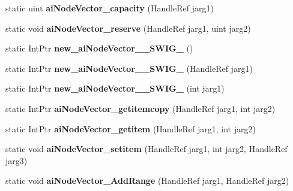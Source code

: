 \begin{DoxyCompactItemize}
\item 
\hypertarget{class_assimp_p_i_n_v_o_k_e_a97a3a3d3aad72b96b598fd50b7a376be}{static uint {\bfseries ai\+Node\+Vector\+\_\+capacity} (Handle\+Ref jarg1)}\label{class_assimp_p_i_n_v_o_k_e_a97a3a3d3aad72b96b598fd50b7a376be}

\item 
\hypertarget{class_assimp_p_i_n_v_o_k_e_afd44c62a430c904b047dfdff0bf4e75c}{static void {\bfseries ai\+Node\+Vector\+\_\+reserve} (Handle\+Ref jarg1, uint jarg2)}\label{class_assimp_p_i_n_v_o_k_e_afd44c62a430c904b047dfdff0bf4e75c}

\item 
\hypertarget{class_assimp_p_i_n_v_o_k_e_a8ef802bbaa2bda6a39f1a766673c5c5e}{static Int\+Ptr {\bfseries new\+\_\+ai\+Node\+Vector\+\_\+\+\_\+\+S\+W\+I\+G\+\_} ()}\label{class_assimp_p_i_n_v_o_k_e_a8ef802bbaa2bda6a39f1a766673c5c5e}

\item 
\hypertarget{class_assimp_p_i_n_v_o_k_e_a12d0d50370572836f72e5e6427dcd753}{static Int\+Ptr {\bfseries new\+\_\+ai\+Node\+Vector\+\_\+\+\_\+\+S\+W\+I\+G\+\_} (Handle\+Ref jarg1)}\label{class_assimp_p_i_n_v_o_k_e_a12d0d50370572836f72e5e6427dcd753}

\item 
\hypertarget{class_assimp_p_i_n_v_o_k_e_a8112a6282d226e2bd074a6f7b172a1a5}{static Int\+Ptr {\bfseries new\+\_\+ai\+Node\+Vector\+\_\+\+\_\+\+S\+W\+I\+G\+\_} (int jarg1)}\label{class_assimp_p_i_n_v_o_k_e_a8112a6282d226e2bd074a6f7b172a1a5}

\item 
\hypertarget{class_assimp_p_i_n_v_o_k_e_a8cd2fed0980089755ba81bba767c5d3f}{static Int\+Ptr {\bfseries ai\+Node\+Vector\+\_\+getitemcopy} (Handle\+Ref jarg1, int jarg2)}\label{class_assimp_p_i_n_v_o_k_e_a8cd2fed0980089755ba81bba767c5d3f}

\item 
\hypertarget{class_assimp_p_i_n_v_o_k_e_a21d07c2cfa9b19c0bcb49d98894e044c}{static Int\+Ptr {\bfseries ai\+Node\+Vector\+\_\+getitem} (Handle\+Ref jarg1, int jarg2)}\label{class_assimp_p_i_n_v_o_k_e_a21d07c2cfa9b19c0bcb49d98894e044c}

\item 
\hypertarget{class_assimp_p_i_n_v_o_k_e_a74901f4ec8386c337507de47762023e7}{static void {\bfseries ai\+Node\+Vector\+\_\+setitem} (Handle\+Ref jarg1, int jarg2, Handle\+Ref jarg3)}\label{class_assimp_p_i_n_v_o_k_e_a74901f4ec8386c337507de47762023e7}

\item 
\hypertarget{class_assimp_p_i_n_v_o_k_e_ac151bf8ed221bee6c0c17b8c91d8e0bd}{static void {\bfseries ai\+Node\+Vector\+\_\+\+Add\+Range} (Handle\+Ref jarg1, Handle\+Ref jarg2)}\label{class_assimp_p_i_n_v_o_k_e_ac151bf8ed221bee6c0c17b8c91d8e0bd}


\end{DoxyCompactItemize}
